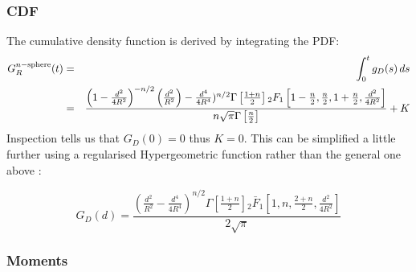 \subsubsection{CDF}

The cumulative density function is derived by integrating the PDF:
\begin{eqnarray}
G^{n-{\rm sphere}}_R(t)
       & = & \int_0^t g_D(s) \, ds \nonumber \\
       & = & \frac{ \left(1-\frac{d^2}{4 R^2}\right)^{-n/2} 
                    \left( \frac{d^2}{R^2} \right)
                   -\frac{d^4}{4 R^4})^{n/2} 
                    \Gamma \left[\frac{1+n}{2}\right] {}_{2}F_{1} 
                    \left[ 1-\frac{n}{2},\frac{n}{2},1+\frac{n}{2},\frac{d^2}{4 R^2} \right]
                  }{n \sqrt{\pi } \Gamma \left[ \frac{n}{2} \right] } + K
\end{eqnarray}
Inspection tells us that  $G_D(0) = 0$  thus  $K = 0$.  This can be simplified a little further using a regularised Hypergeometric function rather than the general one above :

\begin{equation}
G_D(d) =\frac{\left(\frac{d^2}{R^2} -\frac{d^4}{4 R^4}\right)^{n/2} \Gamma\left[\frac{1+n}{2}\right] {}_{2}\bar{F}_{1}\left[1,n,\frac{2+n}{2},\frac{d^2}{4 R^2}\right]}{2 \sqrt{\pi }}
\end{equation}

\subsubsection{Moments}
